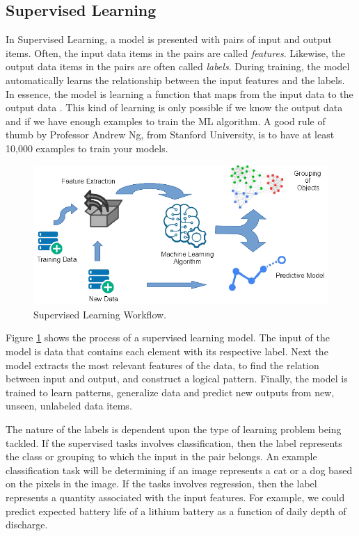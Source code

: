 \documentclass[12pt]{report}
\begin{document}
	
	\subsection{Supervised Learning}
	In Supervised Learning, a model is presented  with pairs of input and output items. Often, the input data items in the pairs are called {\em features}.
	Likewise, the output data items in the pairs are often called  {\em labels}. 
	During training, the model automatically learns   the relationship between the input features and the labels. In essence, the model is learning a  function that maps from the input data to the output data \cite{Russell2010,Kelleher2015}. This kind of learning is only possible if we know the output data \cite{Nilsson1998} and if we have enough examples to train the {ML} algorithm. A good rule of thumb by Professor Andrew Ng, from Stanford University, is to have at least 10,000 examples to train your models. \cite{Stanford2019}
	
	
	\begin{figure}[H]	
		\centering	
		\includegraphics[width=150mm, scale = 1]{images/1_Supervised.png}
		\caption{Supervised Learning Workflow.}
		\label{figure:Supervised_Learning}
	\end{figure}
	
	Figure \ref{figure:Supervised_Learning} shows the process of a supervised learning model. The input of the model is data that contains each element with its respective label. Next the model extracts the most relevant features of the data, to find the relation between input and output, and construct a logical pattern. Finally, the model is trained to learn patterns, generalize data and predict new outputs from  new, unseen, unlabeled data items.
	
	The nature of the labels is dependent upon the type of learning problem being tackled.
	If the supervised tasks involves classification, then the label represents 
	the class or grouping to which the input in the pair belongs. An example classification task will be determining if an image represents a cat or a dog based on the pixels in the image. If the tasks involves regression, then the label represents a quantity associated with the input features. For example, we 
	could predict expected battery life of a lithium battery  as a function of daily depth of discharge.  
	
\end{document}
